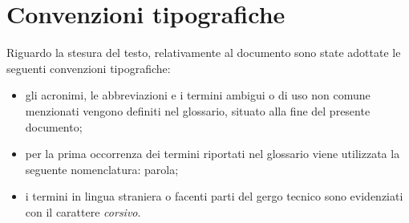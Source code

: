 
\cleardoublepage
{}
\thispagestyle{empty}

\vspace*{3cm}

\chapter*{Convenzioni tipografiche}

Riguardo la stesura del testo, relativamente al documento sono state adottate le seguenti convenzioni tipografiche:
\begin{itemize}
	\item gli acronimi, le abbreviazioni e i termini ambigui o di uso non comune menzionati vengono definiti nel glossario, situato alla fine del presente documento;
	\item per la prima occorrenza dei termini riportati nel glossario viene utilizzata la seguente nomenclatura: parola\glsfirstoccur;
	\item i termini in lingua straniera o facenti parti del gergo tecnico sono evidenziati con il carattere \emph{corsivo}.
\end{itemize}